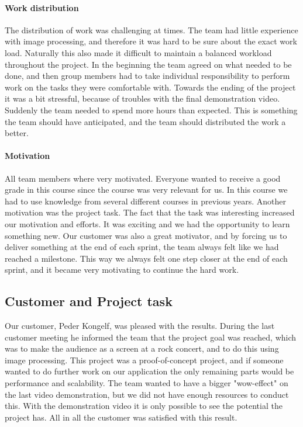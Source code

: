 \paragraph{Work distribution}
The distribution of work was challenging at times. 
The team had little experience with image processing, and therefore it was hard to be sure about the exact work load. Naturally this also made it difficult to maintain a balanced workload throughout the project. 
In the beginning the team agreed on what needed to be done, and then group members had to take individual responsibility to perform work on the tasks they were comfortable with. 
Towards the ending of the project it was a bit stressful, because of troubles with the final demonstration video. Suddenly the team needed to spend more hours than expected. This is something the team should have anticipated, and the team should distributed the work a better.

\paragraph{Motivation}
All team members where very motivated. Everyone wanted to receive a good grade in this course since the course was very relevant for us. In this course we had to use knowledge from several different courses in previous years. Another motivation was the project task. The fact that the task was interesting increased our motivation and efforts. It was exciting and we had the opportunity to learn something new. Our customer was also a great motivator, and by forcing us to deliver something at the end of each sprint, the team always felt like we had reached a milestone. This way we always felt one step closer at the end of each sprint, and it became very motivating to continue the hard work. 

\subsection{Customer and Project task} 
Our customer, Peder Kongelf, was pleased with the results. During the last customer meeting he informed the team that the project goal was reached, which was to make the audience as a screen at a rock concert, and to do this using image processing.
This project was a proof-of-concept project, and if someone wanted to do further work on our application the only remaining parts would be performance and scalability. 
The team wanted to have a bigger "wow-effect" on the last video demonstration, but we did not have enough resources to conduct this. With the demonstration video it is only possible to see the potential the project has. All in all the customer was satisfied with this result. 

